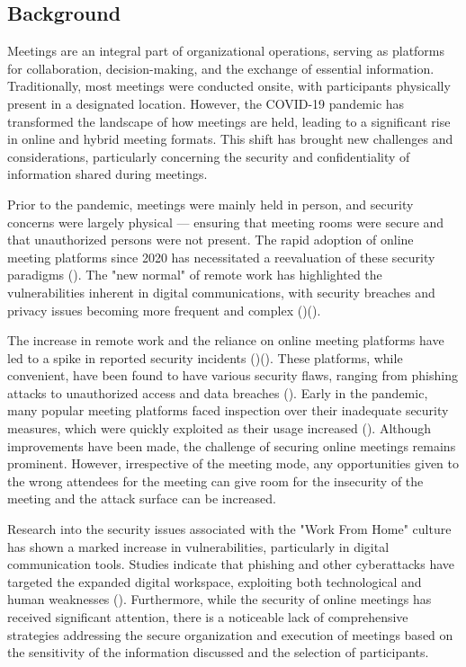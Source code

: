\begin{spacing}{1.0}
    \subsection{Background}
    \indent \par Meetings are an integral part of organizational operations, serving as platforms for collaboration, decision-making, and the exchange of essential information. Traditionally, most meetings were conducted onsite, with participants physically present in a designated location. However, the COVID-19 pandemic has transformed the landscape of how meetings are held, leading to a significant rise in online and hybrid meeting formats. This shift has brought new challenges and considerations, particularly concerning the security and confidentiality of information shared during meetings.
    \par Prior to the pandemic, meetings were mainly held in person, and security concerns were largely physical --- ensuring that meeting rooms were secure and that unauthorized persons were not present. The rapid adoption of online meeting platforms since 2020 has necessitated a reevaluation of these security paradigms (\cite{jo2021}). The "new normal" of remote work has highlighted the vulnerabilities inherent in digital communications, with security breaches and privacy issues becoming more frequent and complex (\cite{bispham2021})(\cite{ozer2024}).
    \par The increase in remote work and the reliance on online meeting platforms have led to a spike in reported security incidents (\cite{jo2021})(\cite{bispham2021}). These platforms, while convenient, have been found to have various security flaws, ranging from phishing attacks to unauthorized access and data breaches (\cite{ozer2024}). Early in the pandemic, many popular meeting platforms faced inspection over their inadequate security measures, which were quickly exploited as their usage increased (\cite{jennings2021}). Although improvements have been made, the challenge of securing online meetings remains prominent. However, irrespective of the meeting mode, any opportunities given to the wrong attendees for the meeting can give room for the insecurity of the meeting and the attack surface can be increased. 
    \par Research into the security issues associated with the "Work From Home" culture has shown a marked increase in vulnerabilities, particularly in digital communication tools. Studies indicate that phishing and other cyberattacks have targeted the expanded digital workspace, exploiting both technological and human weaknesses (\cite{salloum2021}). Furthermore, while the security of online meetings has received significant attention, there is a noticeable lack of comprehensive strategies addressing the secure organization and execution of meetings based on the sensitivity of the information discussed and the selection of participants.

\end{spacing}
